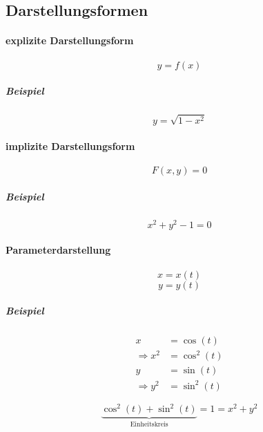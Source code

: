 \subsection{Darstellungsformen}

\paragraph{explizite Darstellungsform}

\[
	y = f(x)
\]

\subparagraph{Beispiel}

\[
	y = \sqrt{1-x^2}
\]

\paragraph{implizite Darstellungsform}

\[
	F(x,y) = 0
\]

\subparagraph{Beispiel}

\[
	x^2 + y^2 - 1 = 0
\]

\paragraph{Parameterdarstellung}

\[
	x = x(t)
\]
\[
	y = y(t)
\]

\subparagraph{Beispiel}

\begin{align*}
	x               & = \cos(t)   \\
	\Rightarrow x^2 & = \cos^2(t) \\
	y               & = \sin(t)   \\
	\Rightarrow y^2 & = \sin^2(t)
\end{align*}

\[
	\underbrace{\cos^2(t) + \sin^2(t)}_{\text{Einheitskreis}} = 1 = x^2 + y^2
\]

